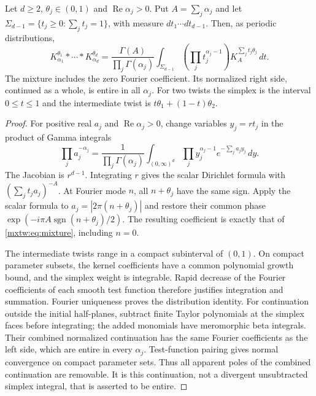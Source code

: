 \begin{theorem}
\label{mxtw:thm:mixture}
Let $d\ge2$, $\theta_j\in(0,1)$ and
$\operatorname{Re}\alpha_j>0$. Put $A=\sum_j\alpha_j$ and let
$\Sigma_{d-1}=\{t_j\ge0:\sum_jt_j=1\}$, with measure
$dt_1\cdots dt_{d-1}$. Then, as periodic distributions,
\begin{equation}\label{mxtw:eq:mixture}
 K_{\alpha_1}^{\theta_1}*\cdots*K_{\alpha_d}^{\theta_d}
 =\frac{\Gamma(A)}{\prod_j\Gamma(\alpha_j)}
   \int_{\Sigma_{d-1}}
       \left(\prod_jt_j^{\alpha_j-1}\right)
       K_A^{\sum_jt_j\theta_j}\,dt.
\end{equation}
The mixture includes the zero Fourier coefficient. Its normalized
right side, continued as a whole, is entire in all $\alpha_j$.
For two twists the simplex is the interval $0\le t\le1$ and the
intermediate twist is $t\theta_1+(1-t)\theta_2$.
\end{theorem}
\begin{proof}
For positive real $a_j$ and $\operatorname{Re}\alpha_j>0$, change
variables $y_j=rt_j$ in the product of Gamma integrals
\[
 \prod_j a_j^{-\alpha_j}
 =\frac1{\prod_j\Gamma(\alpha_j)}
   \int_{(0,\infty)^d}\prod_j y_j^{\alpha_j-1}
                         e^{-\sum_j a_jy_j}\,dy.
\]
The Jacobian is $r^{d-1}$. Integrating $r$ gives the scalar
Dirichlet formula with $(\sum_jt_ja_j)^{-A}$.
At Fourier mode $n$, all $n+\theta_j$ have the same sign.
Apply the scalar formula to $a_j=|2\pi(n+\theta_j)|$ and restore
their common phase $\exp(-i\pi A\operatorname{sgn}(n+\theta_j)/2)$.
The resulting coefficient is exactly that of
\eqref{mxtw:eq:mixture}, including $n=0$.

The intermediate twists range in a compact subinterval of $(0,1)$.
On compact parameter subsets, the kernel coefficients have a common
polynomial growth bound, and the simplex weight is integrable.
Rapid decrease of the Fourier coefficients of each smooth test
function therefore justifies integration and summation. Fourier
uniqueness proves the distribution identity. For continuation outside
the initial half-planes, subtract finite Taylor polynomials at the
simplex faces before integrating; the added monomials have meromorphic
beta integrals. Their combined normalized continuation has the same
Fourier coefficients as the left side, which are entire in every
$\alpha_j$. Test-function pairing gives normal convergence on compact
parameter sets. Thus all apparent poles of the combined continuation
are removable. It is this continuation, not a divergent unsubtracted
simplex integral, that is asserted to be entire.
\end{proof}

